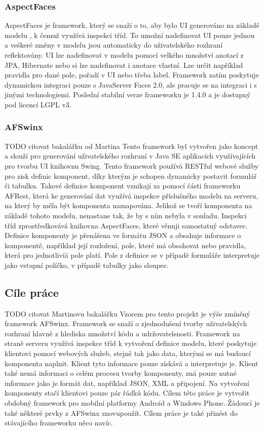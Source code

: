\subsubsection{AspectFaces}
AspectFaces je framework, který se snaží o to, aby bylo UI generováno na základě modelu \cite{aspectdriven}, k čemuž využívá inspekci tříd. To umožní nadefinovat UI pouze jednou a veškeré změny v modelu jsou automaticky do uživatelského rozhraní reflektovány. UI lze nadefinovat v modelu pomocí velkého množství anotací z JPA, Hibernate nebo si lze nadefinovat i anotace vlastní. Lze určit například pravidla pro dané pole, pořadí v UI nebo třeba label. Framework zatím poskytuje dynamickou integraci pouze s JavaServer Faces 2.0, ale pracuje se na integraci i s jinými technologiemi. Poslední stabilní verze frameworku je 1.4.0 a je dostupný pod licencí LGPL v3.

\subsubsection{AFSwinx}
TODO citovat bakalářku od Martina
Tento framework byl vytvořen jako koncept a slouží pro generování uživatelského rozhraní v Java SE aplikacích využívajících pro tvorbu UI knihovnu Swing. Tento framework používá RESTful webové služby pro zisk definic komponent, díky kterým je schopen dynamicky postavit formulář či tabulku. Takové definice komponent vznikají za pomocí části frameworku AFRest, která ke generování dat využívá inspekce příslušného modelu na serveru, na který by měla být komponenta namapována. Jelikož se tvoří komponenta na základě tohoto modelu, nenastane tak, že by s ním nebyla v souladu. Inspekci tříd zprostředkovává knihovna AspectFaces, které věnuji samostatný odstavec. Definice komponenty je přenášena ve formátu JSON a obsahuje informace o komponentě, například její rozložení, pole, které má obsahovat nebo pravidla, která pro jednotlivíá pole platí. Pole z definice se v případě formuláře interpretuje jako vstupní políčko, v případě tabulky jako sloupec. 

\subsection{Cíle práce}
TODO citovat Martinovu bakalářku
Vzorem pro tento projekt je výše zmíněný framework AFSwinx. Framework se snaží o zjednodušení tvorby uživatelských rozhraní hlavně z hlediska množství kódu a udržovatelsnosti. Framework na straně serveru využívá inspekce tříd k vytvoření definice modelu, které poskytuje klientovi pomocí webových služeb, stejně tak jako data, kterými se má budoucí komponenta naplnit. Klient tyto informace pouze získává a interpretuje je. Klient také nemá informaci o celém procesu tvorby komponenty, zná pouze nutné informace jako je formát dat, například JSON, XML a připojení. Na vytvoření komponenty stačí klientovi pouze pár řádků kódu. Cílem této práce je vytvořit obdobný framework pro mobilní platformy Android a Windows Phone. Žádoucí je také některé prvky z AFSwinx znovupoužít. Cílem práce je také přinést do stávajícího frameworku něco navíc.
